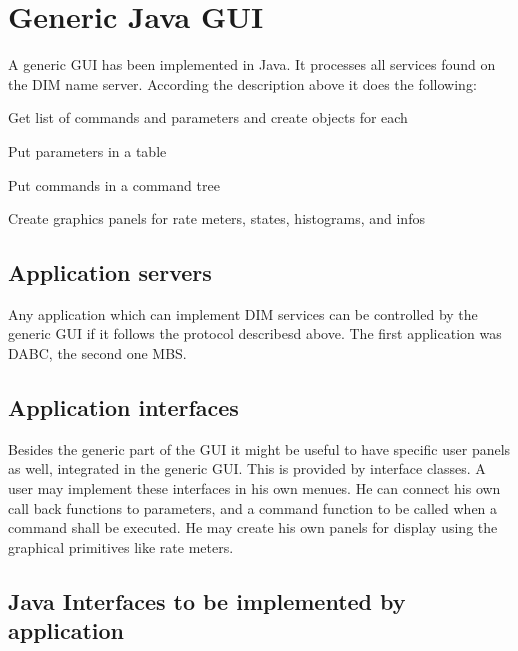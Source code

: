 \section{Generic Java GUI}
A generic GUI has been implemented in Java. It processes all services found on the DIM name server. According the description above it does the following:
\begin{compactitem}[$\bullet$]
\item Get list of commands and parameters and create objects for each
\item Put parameters in a table
\item Put commands in a command tree
\item Create graphics panels for rate meters, states, histograms, and infos
\end{compactitem}
\subsection{Application servers}
Any application which can implement DIM services can be controlled by the generic GUI if it follows the protocol describesd above. The first application was DABC, the second one MBS.

\subsection{Application interfaces}
Besides the generic part of the GUI it might be useful to have specific user panels as well, integrated in the generic GUI. This is provided by interface classes. A user may implement these interfaces in his own menues. He can connect his own call back functions to parameters, and a command function to be called when a command shall be executed. He may create his own panels for display using the graphical primitives like rate meters.

\subsection{Java Interfaces to be implemented by application}
